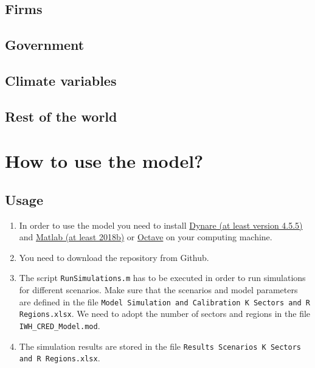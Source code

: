 \documentclass[10pt,a4paper]{article}
\begin{document}
\subsection{Firms}

\subsection{Government}

\subsection{Climate variables}

\subsection{Rest of the world}


\cleardoublepage
\section{How to use the model?}\label{sec:modelusage}
\subsection{Usage}
\begin{enumerate}
\item In order to use the model you need to install \href{https://www.dynare.org/}{Dynare (at least version 4.5.5)}  and \href{https://www.mathworks.com/products/matlab.html}{Matlab (at least 2018b)} or \href{https://www.gnu.org/software/octave/}{Octave} on your computing machine. 
\item You need to download the repository from Github. 
\item The script {\tt RunSimulations.m} has to be executed in order to run simulations for different scenarios. Make sure that the scenarios and model parameters are defined in the file {\tt Model Simulation and Calibration K Sectors and R Regions.xlsx}. We need to adopt the number of sectors and regions in the file {\tt IWH\_CRED\_Model.mod}.
\item The simulation results are stored in the file {\tt Results Scenarios K Sectors and R Regions.xlsx}.
\end{enumerate}
\end{document}
